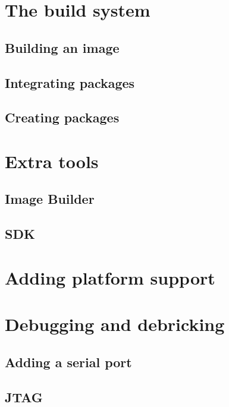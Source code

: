 \documentclass[a4paper]{book}
\begin{document}
  \section{The build system}
    \subsection{Building an image}
    \subsection{Integrating packages}
    \subsection{Creating packages}
  \section{Extra tools}
    \subsection{Image Builder}
    \subsection{SDK}
  \section{Adding platform support}
  \section{Debugging and debricking}
    \subsection{Adding a serial port}
    \subsection{JTAG}
\end{document}

